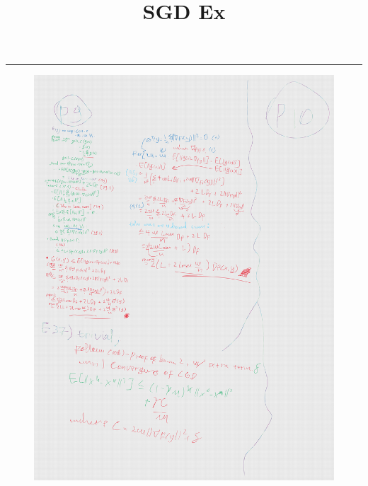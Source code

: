 \documentclass{article}
\title{SGD Ex}
\begin{document}
\maketitle

\hrule
\hyperlink{https://www.probabilitycourse.com/chapter6/6_2_2_markov_chebyshev_inequalities.php}{}

\begin{figure}
    \includegraphics[width=\textwidth,height=\textheight,keepaspectratio]{img/P9.png}
\end{figure}
\end{document}
